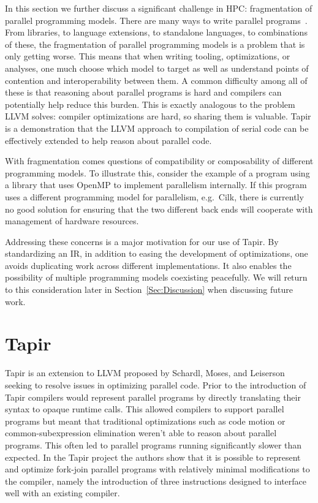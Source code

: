 \documentclass[sigconf]{acmart}
\begin{document}
In this section we further discuss a significant challenge in HPC:
fragmentation of parallel programming models. There are many ways to write
parallel programs~\cite{openmp, qthreads, chapel, cilk, kokkos, legion, upc,
mpi}.  From libraries, to language extensions, to standalone languages, to
combinations of these, the fragmentation of parallel programming models is a
problem that is only getting worse. This means that when writing tooling,
optimizations, or analyses, one much choose which model to target as well as
understand points of contention and interoperability between them. A common
difficulty among all of these is that reasoning about parallel programs is hard
and compilers can potentially help reduce this burden. This is exactly
analogous to the problem LLVM solves: compiler optimizations are hard, so
sharing them is valuable. Tapir is a demonstration that the LLVM approach to
compilation of serial code can be effectively extended to help reason about
parallel code.

With fragmentation comes questions of compatibility or composability of
different programming models. To illustrate this, consider the example of
a program using a library that uses OpenMP to implement parallelism internally.
If this program uses a different programming model for parallelism, e.g.\ Cilk,
there is currently no good solution for ensuring that the two different back ends
will cooperate with management of hardware resources.

Addressing these concerns is a major motivation for our use of Tapir.  By
standardizing an IR, in addition to easing the development of optimizations,
one avoids duplicating work across different implementations. It also enables
the possibility of multiple programming models coexisting peacefully. We will
return to this consideration later in Section~\ref{Sec:Discussion} when
discussing future work.

\section{Tapir} \label{Sec:Tapir}
Tapir is an extension to LLVM proposed by Schardl, Moses, and Leiserson
seeking to resolve issues in optimizing parallel code. Prior to
the introduction of Tapir compilers would represent parallel programs
by directly translating their syntax to opaque runtime calls. This allowed
compilers to support parallel programs but meant that traditional
optimizations such as code motion or common-subexpression elimination weren't
able to reason about parallel programs. This often led to parallel programs
running significantly slower than expected. In the Tapir project the authors
show that it is possible to represent and optimize fork-join parallel programs
with relatively minimal modifications to the compiler, namely the introduction
of three instructions designed to interface well with an existing compiler.
\end{document}
